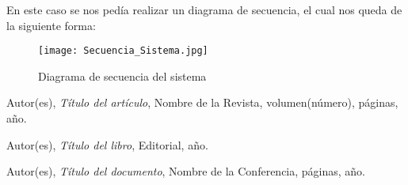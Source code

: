 \documentclass[a4paper,12pt]{article}
\begin{document}
En este caso se nos pedía realizar un diagrama de secuencia, el cual nos queda de la siguiente forma:

\begin{figure}[H]
    \centering
    \texttt{[image: Secuencia\_Sistema.jpg]}
    \caption{Diagrama de secuencia del sistema}
    \label{fig:secuencia_sistema}
\end{figure}




\newpage
\begin{thebibliography}{99}
Autor(es), \emph{Título del artículo}, Nombre de la Revista, volumen(número), páginas, año.

Autor(es), \emph{Título del libro}, Editorial, año.

Autor(es), \emph{Título del documento}, Nombre de la Conferencia, páginas, año.
\end{thebibliography}
\end{document}
